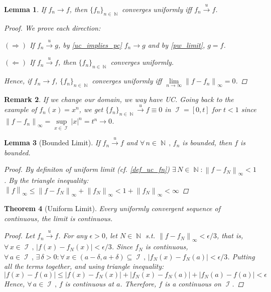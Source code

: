 \documentclass[12pt]{article}
\let\RA\Rightarrow
\let\LA\Leftarrow
\let\ee\epsilon
\newcommand{\Forall}[1]{\forall\,{#1}\,,\,}
\newcommand{\Exist}[1]{\exists\,{#1}:}
\DeclareMathOperator{\N}{\mathbb{N}}
\DeclareMathOperator{\I}{\mathcal{I}}
\newcommand{\seq}[2]{\{{#1}\}_{#2\in\N}}
\newcommand{\fsup}[1]{\left\|#1\right\|_\infty}
\newcommand{\uto}[0]{\overset{\displaystyle u}{\longrightarrow}}
\newtheorem{theorem}{Theorem}[subsection]
\newtheorem{lemma}[theorem]{Lemma}
\newtheorem{remark}[theorem]{Remark}
\begin{document}
\begin{lemma}
  \label{pc_limit_is_uc_limit}
  If $f_n\to f$, then $\seq{f_n}{n}$ converges uniformly iff $f_n\uto f$.
  \begin{proof}
    We prove each direction:
    \begin{compactitem}
      \item[$(\RA)$] If $f_n\uto g$, by \ref{uc_implies_pc} $f_n\to g$ and by \ref{pw_limit}, $g=f$.
      \item[$(\LA)$] If $f_n\uto f$, then $\seq{f_n}{n}$ converges uniformly.
    \end{compactitem}
    Hence, if $f_n\to f$, $\seq{f_n}{n}$ converges uniformly iff $\lim\limits_{n\to\infty}\fsup{f-f_n}=0$.
  \end{proof}
\end{lemma}

\begin{remark}
  If we change our domain, we way have UC. Going back to the example of $f_n(x)=x^n$, we get $\seq{f_n}{n}\uto f\equiv 0$ in $\I=[0,t]$ for $t<1$ since $\fsup{f-f_n}=\sup\limits_{x\in\I}|x|^n=t^n\to 0$.
\end{remark}

\begin{lemma}[Bounded Limit]
  \label{uniform_bdd_limit}
  If $f_n\uto f$ and $\Forall{n\in\N} f_n$ is bounded, then $f$ is bounded.
  \begin{proof}
    By definiton of uniform limit (cf. \ref{def_uc_fn}) $\Exist{N\in\N}\fsup{f-f_N}<1$. By the triangle inequality:
    $\fsup{f}\leq\fsup{f-f_N}+\fsup{f_N}<1+\fsup{f_N}<\infty$
  \end{proof}
\end{lemma}

\begin{theorem}[Uniform Limit]
  \label{uniform_cont_limit}
  Every uniformly convergent sequence of continuous, the limit is continuous.
  \begin{proof}
    Let $f_n\uto f$. For any $\ee>0$, let $N\in\N$ s.t. $\fsup{f-f_N}<\ee/3$, that is, $\Forall{x\in \I} |f(x)-f_N(x)|<\ee/3$. Since $f_N$ is continuous, $\Forall{a\in \I}\Exist{\delta>0}\Forall{x\in (a-\delta,a+\delta)\subseteq\I}|f_N(x)-f_N(a)|<\ee/3$. Putting all the terms together, and using triangle inequality: $$|f(x)-f(a)|\leq |f(x)-f_N(x)|+|f_N(x)-f_N(a)|+|f_N(a)-f(a)|<\ee$$
    Hence, $\Forall{a\in \I}f$ is continuous at $a$. Therefore, $f$ is a continuous on $\I$.
  \end{proof}
\end{theorem}
\end{document}
